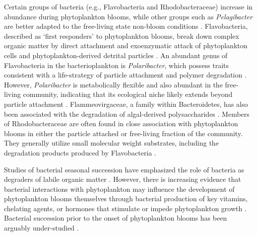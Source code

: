 Certain groups of bacteria (e.g., Flavobacteria and Rhodobacteraceae) increase in abundance during phytoplankton blooms, while other groups such as \emph{Pelagibacter} are better adapted to the free-living state non-bloom conditions \citep{williams2013role, Buchan2014-yh, Voget2015-ch}. Flavobacteria, described as `first responders' to phytoplankton blooms, break down complex organic matter by direct attachment and exoenzymatic attack of phytoplankton cells and phytoplankton-derived detrital particles \citep{williams2013role}. An abundant genus of Flavobacteria in the bacterioplankton is \emph{Polaribacter}, which possess traits consistent with a life-strategy of particle attachment and polymer degradation \citep{Fernandez-Gomez2013-wr}. However, \emph{Polaribacter} is metabolically flexible and also abundant in the free-living community, indicating that its ecological niche likely extends beyond particle attachment \citep{williams2013role, smith2013freeliving}. Flammeovirgaceae, a family within Bacteroidetes, has also been associated with the degradation of algal-derived polysaccharides \citep{Chan2015-pw, Liu2015-po, Voget2015-ch}. Members of Rhodobacteraceae are often found in close association with phytoplankton blooms in either the particle attached or free-living fraction of the community. They generally utilize small molecular weight substrates, including the degradation products produced by Flavobacteria \citep{Pinhassi2004-kc, West2008-vp, wemheuer2015green}.

Studies of bacterial seasonal succession have emphasized the role of bacteria as degraders of labile organic matter \citep{Teeling2012-jz, Moran2015-dd, Needham2016-xb}. However, there is increasing evidence that bacterial interactions with phytoplankton may influence the development of phytoplankton blooms themselves through bacterial production of key vitamins, chelating agents, or hormones that stimulate or impede phytoplankton growth \citep{Amin2012-tv, Amin2015-pp, Prieto2015-oi, Wang2016-lt}. Bacterial succession prior to the onset of phytoplankton blooms has been arguably under-studied \citep{Moran2015-dd, Needham2016-xb}.

